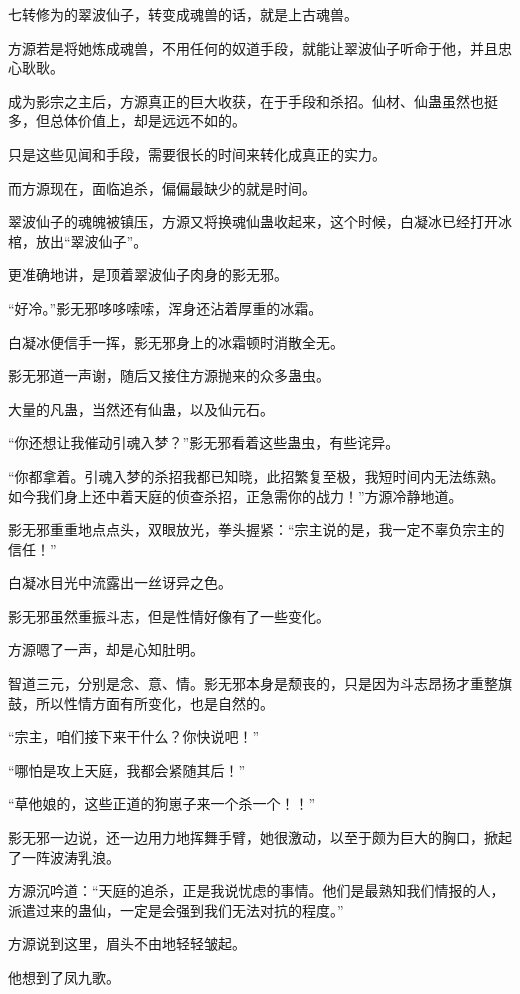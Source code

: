 \begin{this_body}
七转修为的翠波仙子，转变成魂兽的话，就是上古魂兽。

方源若是将她炼成魂兽，不用任何的奴道手段，就能让翠波仙子听命于他，并且忠心耿耿。

成为影宗之主后，方源真正的巨大收获，在于手段和杀招。仙材、仙蛊虽然也挺多，但总体价值上，却是远远不如的。

只是这些见闻和手段，需要很长的时间来转化成真正的实力。

而方源现在，面临追杀，偏偏最缺少的就是时间。

翠波仙子的魂魄被镇压，方源又将换魂仙蛊收起来，这个时候，白凝冰已经打开冰棺，放出“翠波仙子”。

更准确地讲，是顶着翠波仙子肉身的影无邪。

“好冷。”影无邪哆哆嗦嗦，浑身还沾着厚重的冰霜。

白凝冰便信手一挥，影无邪身上的冰霜顿时消散全无。

影无邪道一声谢，随后又接住方源抛来的众多蛊虫。

大量的凡蛊，当然还有仙蛊，以及仙元石。

“你还想让我催动引魂入梦？”影无邪看着这些蛊虫，有些诧异。

“你都拿着。引魂入梦的杀招我都已知晓，此招繁复至极，我短时间内无法练熟。如今我们身上还中着天庭的侦查杀招，正急需你的战力！”方源冷静地道。

影无邪重重地点点头，双眼放光，拳头握紧：“宗主说的是，我一定不辜负宗主的信任！”

白凝冰目光中流露出一丝讶异之色。

影无邪虽然重振斗志，但是性情好像有了一些变化。

方源嗯了一声，却是心知肚明。

智道三元，分别是念、意、情。影无邪本身是颓丧的，只是因为斗志昂扬才重整旗鼓，所以性情方面有所变化，也是自然的。

“宗主，咱们接下来干什么？你快说吧！”

“哪怕是攻上天庭，我都会紧随其后！”

“草他娘的，这些正道的狗崽子来一个杀一个！！”

影无邪一边说，还一边用力地挥舞手臂，她很激动，以至于颇为巨大的胸口，掀起了一阵波涛乳浪。

方源沉吟道：“天庭的追杀，正是我说忧虑的事情。他们是最熟知我们情报的人，派遣过来的蛊仙，一定是会强到我们无法对抗的程度。”

方源说到这里，眉头不由地轻轻皱起。

他想到了凤九歌。


\end{this_body}
